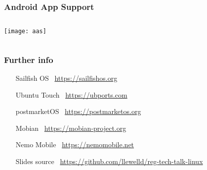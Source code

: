 \documentclass[
	notes=none,
	aspectratio=169
]{beamer}
\begin{document}

\begin{frame}
\frametitle{Android App Support}

\begin{columns}[T]
\begin{column}[T]{1.0\textwidth}
\setlength{\parskip}{0.5em}

\begin{column}[T]{1.0\textwidth}

\vspace{0.5cm}
\texttt{[image: aas]}

\end{column}

\end{column}
\end{columns}

\end{frame}
\note{
}


\begin{frame}[fragile]
\frametitle{Further info}
\setlength{\leftmargini}{7.0em}
\vspace{0.8cm}

\begin{itemize}
\setlength{\parskip}{1.0em}
\item[Sailfish OS] \, \url{https://sailfishos.org}
\item[Ubuntu Touch] \, \url{https://ubports.com}
\item[postmarketOS] \, \url{https://postmarketos.org}
\item[Mobian] \, \url{https://mobian-project.org}
\item[Nemo Mobile] \, \url{https://nemomobile.net}
\item[Slides source] \, \url{https://github.com/llewelld/reg-tech-talk-linux}
\end{itemize}

\end{frame}

\end{document}
